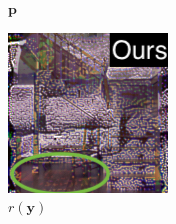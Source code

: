 \begin{figure}[]
\begin{subfigure}{\textwidth}
\begin{subfigure}{0.19\textwidth}
            \caption{\(\bm{p}\)}
            \label{fig:ex03-staircase_illum-beams-stats_im}
        \end{subfigure}
        \hfill
        \begin{subfigure}{0.19\textwidth}
            \centering
            \includegraphics[width=\textwidth]{images/04-experiment03/staircase_illum/beams/stats_proj_highlighted2.jpg}
            \caption{\(r(\bm{y})\)}
            \label{fig:ex03-staircase_illum-beams-stats_proj}
        \end{subfigure}
        \hfill
        \begin{subfigure}{0.19\textwidth}
            \centering

\end{subfigure}
\end{subfigure}
\end{figure}
